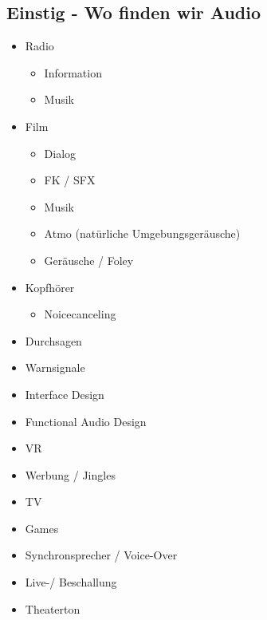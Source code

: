 \subsection{Einstig - Wo finden wir Audio}
\begin{itemize}
    \item Radio
    \begin{itemize}
        \item Information 
        \item Musik
    \end{itemize}
    \item Film
    \begin{itemize}
        \item   Dialog
        \item  FK / SFX
        \item  Musik
        \item  Atmo (natürliche Umgebungsgeräusche)
        \item Geräusche / Foley
    \end{itemize}
    \item Kopfhörer
    \begin{itemize}
        \item Noicecanceling
    \end{itemize}
    \item Durchsagen
    \item Warnsignale
    \item Interface Design
    \item Functional Audio Design
    \item VR
    \item Werbung / Jingles
    \item TV
    \item Games
    \item Synchronsprecher / Voice-Over
    \item Live-/ Beschallung
    \item Theaterton
\end{itemize}
\newpage